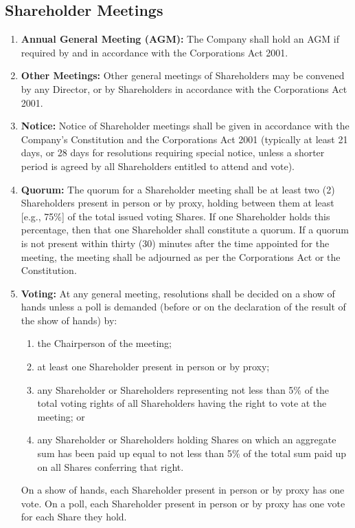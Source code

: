 \subsection{Shareholder Meetings}
\begin{enumerate}[label=(\alph*), wide, labelwidth=!, labelindent=0pt]
\item \textbf{Annual General Meeting (AGM):} The Company shall hold an AGM if required by and in accordance with the Corporations Act 2001.
\item \textbf{Other Meetings:} Other general meetings of Shareholders may be convened by any Director, or by Shareholders in accordance with the Corporations Act 2001.
\item \textbf{Notice:} Notice of Shareholder meetings shall be given in accordance with the Company's Constitution and the Corporations Act 2001 (typically at least 21 days, or 28 days for resolutions requiring special notice, unless a shorter period is agreed by all Shareholders entitled to attend and vote).
\item \textbf{Quorum:} The quorum for a Shareholder meeting shall be at least two (2) Shareholders present in person or by proxy, holding between them at least [e.g., 75\%] of the total issued voting Shares. If one Shareholder holds this percentage, then that one Shareholder shall constitute a quorum. If a quorum is not present within thirty (30) minutes after the time appointed for the meeting, the meeting shall be adjourned as per the Corporations Act or the Constitution.
\item \textbf{Voting:} At any general meeting, resolutions shall be decided on a show of hands unless a poll is demanded (before or on the declaration of the result of the show of hands) by:
    \begin{enumerate}[label=(\roman*), wide, labelwidth=!, labelindent=0pt]
    \item the Chairperson of the meeting;
    \item at least one Shareholder present in person or by proxy;
    \item any Shareholder or Shareholders representing not less than 5\% of the total voting rights of all Shareholders having the right to vote at the meeting; or
    \item any Shareholder or Shareholders holding Shares on which an aggregate sum has been paid up equal to not less than 5\% of the total sum paid up on all Shares conferring that right.
    \end{enumerate}
    On a show of hands, each Shareholder present in person or by proxy has one vote. On a poll, each Shareholder present in person or by proxy has one vote for each Share they hold.

\end{enumerate}
